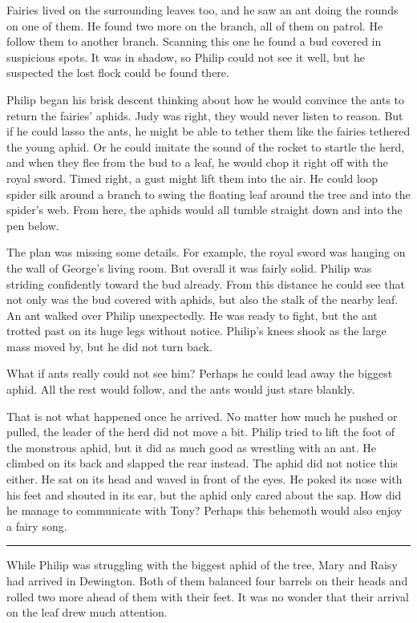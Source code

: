 \documentclass[10pt]{memoir}
\renewcommand{\pfbreakdisplay}{\bigskip \ding{166} \bigskip}
\newcommand{\secbreak}{\fancybreak{\pfbreakdisplay}}
\begin{document}
Fairies lived on the surrounding leaves too, and he saw an ant doing the rounds
on one of them. He found two more on the branch, all of them on patrol. He
follow them to another branch. Scanning this one he found a bud covered in
suspicious spots. It was in shadow, so Philip could not see it well, but he
suspected the lost flock could be found there.

Philip began his brisk descent thinking about how he would convince the ants to
return the fairies' aphids. Judy was right, they would never listen to reason.
But if he could lasso the ants, he might be able to tether them like the
fairies tethered the young aphid. Or he could imitate the sound of the rocket
to startle the herd, and when they flee from the bud to a leaf, he would chop
it right off with the royal sword. Timed right, a gust might lift them into the
air. He could loop spider silk around a branch to swing the floating leaf
around the tree and into the spider's web. From here, the aphids would all
tumble straight down and into the pen below.

The plan was missing some details. For example, the royal sword was hanging on
the wall of George's living room. But overall it was fairly solid. Philip was
striding confidently toward the bud already. From this distance he could see
that not only was the bud covered with aphids, but also the stalk of the nearby
leaf. An ant walked over Philip unexpectedly. He was ready to fight, but the
ant trotted past on its huge legs without notice. Philip's knees shook as the
large mass moved by, but he did not turn back.

What if ants really could not see him? Perhaps he could lead away the biggest
aphid. All the rest would follow, and the ants would just stare blankly.

That is not what happened once he arrived. No matter how much he pushed or
pulled, the leader of the herd did not move a bit. Philip tried to lift the
foot of the monstrous aphid, but it did as much good as wrestling with an ant.
He climbed on its back and slapped the rear instead. The aphid did not notice
this either. He sat on its head and waved in front of the eyes. He poked its
nose with his feet and shouted in its ear, but the aphid only cared about the
sap. How did he manage to communicate with Tony? Perhaps this behemoth would
also enjoy a fairy song.

\secbreak

While Philip was struggling with the biggest aphid of the tree, Mary and Raisy
had arrived in Dewington. Both of them balanced four barrels on their heads
and rolled two more ahead of them with their feet. It was no wonder that their
arrival on the leaf drew much attention.
\end{document}
